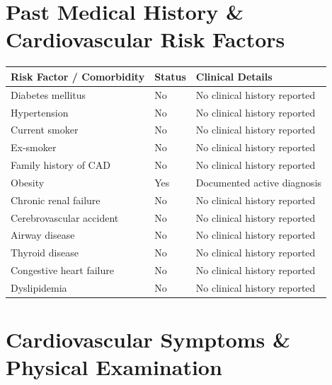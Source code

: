 \documentclass[10pt,a4paper]{article}
\begin{document}
\vspace{8pt}

\section*{Past Medical History \& Cardiovascular Risk Factors}

\begin{tabular}{@{} p{6.8cm} p{2.8cm} p{5.5cm} @{}}
  \toprule
  \textbf{Risk Factor / Comorbidity} & \textbf{Status} & \textbf{Clinical Details} \\
  \midrule
  Diabetes mellitus & No & No clinical history reported \\
  Hypertension & No & No clinical history reported \\
  Current smoker & No & No clinical history reported \\
  Ex-smoker & No & No clinical history reported \\
  Family history of CAD & No & No clinical history reported \\
  Obesity & Yes & Documented active diagnosis \\
  Chronic renal failure & No & No clinical history reported \\
  Cerebrovascular accident & No & No clinical history reported \\
  Airway disease & No & No clinical history reported \\
  Thyroid disease & No & No clinical history reported \\
  Congestive heart failure & No & No clinical history reported \\
  Dyslipidemia & No & No clinical history reported \\
  \bottomrule
\end{tabular}

\vspace{8pt}

\section*{Cardiovascular Symptoms \& Physical Examination}
\end{document}
